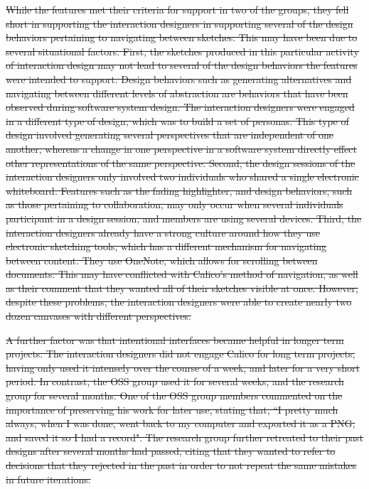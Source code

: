 \documentclass[12pt,fleqn]{ucithesis}
\providecommand{\DIFdeltex}[1]{{\protect\color{red}\sout{#1}}}                      %
\providecommand{\DIFdel}[1]{\texorpdfstring{\DIFdeltex{#1}}{}} %
\begin{document}
\DIFdel{While the features met their criteria for support in two of the groups, they fell short in supporting the interaction designers in supporting several of the design behaviors pertaining to navigating between sketches. This may have been due to several situational factors. First, the sketches produced in this particular activity of interaction design may not lead to several of the design behaviors the features were intended to support. Design behaviors such as generating alternatives and navigating between different levels of abstraction are behaviors that have been observed during software system design. The interaction designers were engaged in a different type of design, which was to build a set of personas. This type of design involved generating several perspectives that are independent of one another, whereas a change in one perspective in a software system directly effect other representations of the same perspective. Second, the design sessions of the interaction designers only involved two individuals who shared a single electronic whiteboard. Features such as the fading highlighter, and design behaviors, such as those pertaining to collaboration, may only occur when several individuals participant in a design session, and members are using several devices. Third, the interaction designers already have a strong culture around how they use electronic sketching tools, which has a different mechanism for navigating between content. They use OneNote, which allows for scrolling between documents. This may have conflicted with Calico's method of navigation, as well as their comment that they wanted all of their sketches visible at once. However, despite these problems, the interaction designers were able to create nearly two dozen canvases with different perspectives.
}%


\DIFdel{A further factor was that intentional interfaces became helpful in longer term projects. The interaction designers did not engage Calico for long term projects, having only used it intensely over the course of a week, and later for a very short period. In contrast, the OSS group used it for several weeks, and the research group for several months. One of the OSS group members commented on the importance of preserving his work for later use, stating that, ``I pretty much always, when I was done, went back to my computer and exported it as a PNG, and saved it so I had a record". The research group further retreated to their past designs after several months had passed, citing that they wanted to refer to decisions that they rejected in the past in order to not repeat the same mistakes in future iterations. 
}%
\end{document}
